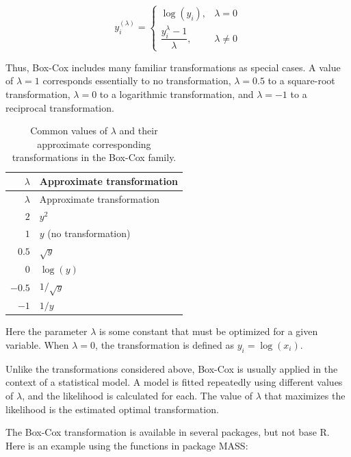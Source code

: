 \documentclass[
  13,
  letterpaper,
]{report}
\begin{document}
\[
y_i^{(\lambda)}=
\begin{cases}
\log(y_i), & \lambda=0 \\[4pt]
\dfrac{y_i^\lambda-1}{\lambda}, & \lambda\ne0
\end{cases}
\]

Thus, Box-Cox includes many familiar transformations as special cases. A
value of \(\lambda=1\) corresponds essentially to no transformation,
\(\lambda=0.5\) to a square-root transformation, \(\lambda=0\) to a
logarithmic transformation, and \(\lambda=-1\) to a reciprocal
transformation.

\begin{longtable}[]{@{}rl@{}}
\caption{Common values of \(\lambda\) and their approximate
corresponding transformations in the Box-Cox
family.}\label{tbl-boxcox-transform}\tabularnewline
\toprule\noalign{}
\(\lambda\) & Approximate transformation \\
\midrule\noalign{}
\endfirsthead
\toprule\noalign{}
\(\lambda\) & Approximate transformation \\
\midrule\noalign{}
\endhead
\bottomrule\noalign{}
\endlastfoot
\(2\) & \(y^2\) \\
\(1\) & \(y\) (no transformation) \\
\(0.5\) & \(\sqrt{y}\) \\
\(0\) & \(\log(y)\) \\
\(-0.5\) & \(1/\sqrt{y}\) \\
\(-1\) & \(1/y\) \\
\end{longtable}

Here the parameter \(\lambda\) is some constant that must be optimized
for a given variable. When \(\lambda=0\), the transformation is defined
as \(y_i=\log{\left(x_i\right)}\).

Unlike the transformations considered above, Box-Cox is usually applied
in the context of a statistical model. A model is fitted repeatedly
using different values of \(\lambda\), and the likelihood is calculated
for each. The value of \(\lambda\) that maximizes the likelihood is the
estimated optimal transformation.

The Box-Cox transformation is available in several packages, but not
base R. Here is an example using the functions in package MASS:
\end{document}
